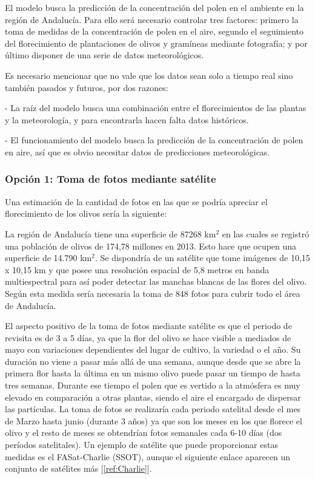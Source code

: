 \documentclass[12pt,oneside,a4paper]{article}
\numberwithin{figure}{section}
\begin{document}
El modelo busca la predicción de la concentración del polen en el ambiente en la región de Andalucía. Para ello será necesario controlar tres factores: primero la toma de medidas de la concentración de polen en el aire, segundo el seguimiento del florecimiento de plantaciones de olivos y gramíneas mediante fotografía; y por último disponer de una serie de datos meteorológicos.

Es necesario mencionar que no vale que los datos sean solo a tiempo real sino también pasados y futuros, por dos razones:

- La raíz del modelo busca una combinación entre el florecimientos de las plantas y la meteorología, y para encontrarla hacen falta datos históricos.

- El funcionamiento del modelo busca la predicción de la concentración de polen en aire, así que es obvio necesitar datos de predicciones meteorológicas.

\subsubsection{Opción 1: Toma de fotos mediante satélite}

Una estimación de la cantidad de fotos en las que se podría apreciar el florecimiento de los olivos sería la siguiente:

La región de Andalucía tiene una superficie de 87268 km$^2$ en las cuales se registró una población de olivos de 174,78 millones en 2013. Esto hace que ocupen una superficie de 14.790 km$^2$. Se dispondría de un satélite que tome imágenes de 10,15 x 10,15 km y que posee una resolución espacial de 5,8 metros en banda multiespectral para así poder detectar las manchas blancas de las flores del olivo. Según esta medida sería necesaria la toma de 848 fotos para cubrir todo el área de Andalucía.

El aspecto positivo de la toma de fotos mediante satélite es que el periodo de revisita es de 3 a 5 días, ya que la flor del olivo se hace visible a mediados de mayo con variaciones dependientes del lugar de cultivo, la variedad o el año. Su duración no viene a pasar más allá de una semana, aunque desde que se abre la primera flor hasta la última en un mismo olivo puede pasar un tiempo de hasta tres semanas. Durante ese tiempo el polen que es vertido a la atmósfera es muy elevado en comparación a otras plantas, siendo el aire el encargado de dispersar las partículas. La toma de fotos se realizaría cada periodo satelital desde el mes de Marzo hasta junio (durante 3 años) ya que son los meses en los que florece el olivo y el resto de meses se obtendrían fotos semanales cada 6-10 días (dos períodos satelitales). Un ejemplo de satélite que puede proporcionar estas medidas es el FASat-Charlie (SSOT), aunque el siguiente enlace aparecen un conjunto de satélites más [\ref{ref:Charlie}].
\end{document}
